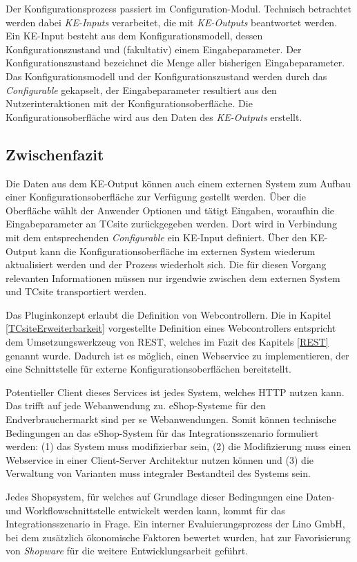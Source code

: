 \documentclass[11pt, a4paper, titlepage, listof=totoc, bibliography=totoc, index=totoc, twoside, openright, headings=normal]{scrreprt}
\begin{document}
Der Konfigurationsprozess passiert im Configuration-Modul. Technisch betrachtet werden dabei \emph{KE-Inputs} verarbeitet, die mit \emph{KE-Outputs} beantwortet werden. Ein KE-Input besteht aus dem Konfigurationsmodell, dessen Konfigurationszustand und (fakultativ) einem Eingabeparameter. Der Konfigurationszustand bezeichnet die Menge aller bisherigen Eingabeparameter. Das Konfigurationsmodell und der Konfigurationszustand werden durch das \emph{Configurable} gekapselt, der Eingabeparameter resultiert aus den Nutzerinteraktionen mit der Konfigurationsoberfläche. Die Konfigurationsoberfläche wird aus den Daten des \emph{KE-Outputs} erstellt.

\subsection{Zwischenfazit}
\label{TCsiteFazit}

Die Daten aus dem KE-Output können auch einem externen System zum Aufbau einer Konfigurationsoberfläche zur Verfügung gestellt werden. Über die Oberfläche wählt der Anwender Optionen und tätigt Eingaben, woraufhin die Eingabeparameter an TCsite zurückgegeben werden. Dort wird in Verbindung mit dem entsprechenden \emph{Configurable} ein KE-Input definiert. Über den KE-Output kann die Konfigurationsoberfläche im externen System wiederum aktualisiert werden und der Prozess wiederholt sich. Die für diesen Vorgang relevanten Informationen müssen nur irgendwie zwischen dem externen System und TCsite transportiert werden.

Das Pluginkonzept erlaubt die Definition von Webcontrollern. Die in Kapitel \ref{TCsiteErweiterbarkeit} vorgestellte Definition eines Webcontrollers entspricht dem  Umsetzungswerkzeug von REST, welches im Fazit des Kapitels \ref{REST} genannt wurde. Dadurch ist es möglich, einen Webservice zu implementieren, der eine Schnittstelle für externe Konfigurationsoberflächen bereitstellt.

Potentieller Client dieses Services ist jedes System, welches HTTP nutzen kann. Das trifft auf jede Webanwendung zu. eShop-Systeme für den Endverbrauchermarkt sind per se Webanwendungen. Somit können technische Bedingungen an das eShop-System für das Integrationsszenario formuliert werden: (1) das System muss modifizierbar sein, (2) die Modifizierung muss einen Webservice in einer Client-Server Architektur nutzen können und (3) die Verwaltung von Varianten muss integraler Bestandteil des Systems sein.

Jedes Shopsystem, für welches auf Grundlage dieser Bedingungen eine Daten- und Workflowschnittstelle entwickelt werden kann, kommt für das Integrationsszenario in Frage. Ein interner Evaluierungsprozess der Lino GmbH, bei dem zusätzlich ökonomische Faktoren bewertet wurden, hat zur Favorisierung von \emph{Shopware} für die weitere Entwicklungsarbeit geführt.
\end{document}
